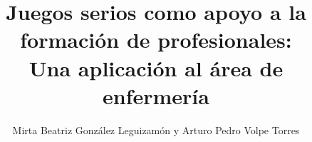 \documentclass[final,fmstyle]{./util/ucathesis}
\title{Juegos serios como apoyo a la formación de profesionales: \protect\\ Una aplicación al 
área de  enfermería}
\author{Mirta Beatriz González Leguizamón y Arturo Pedro Volpe Torres}
\begin{document}


\maketitle

\tableofcontents
\listoffigures
\listoftables
\listofalgorithms




\mainmatter












\appendix


\printbibliography{}
\end{document}
